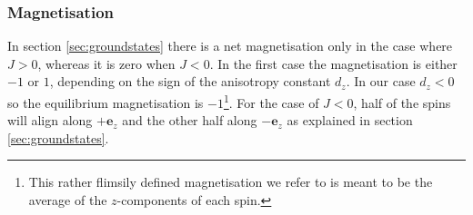 \subsubsection{Magnetisation}

In section \ref{sec:groundstates} there is a net magnetisation only in the case where $J>0$, whereas it is zero when $J<0$. In the first case the magnetisation is either $-1$ or $1$, depending on the sign of the anisotropy constant $d_z$. In our case $d_z < 0$ so the equilibrium magnetisation is $-1$\footnote{This rather flimsily defined magnetisation we refer to is meant to be the average of the $z$-components of each spin.}. For the case of $J<0$, half of the spins will align along $+\mathbf{e}_z$ and the other half along $-\mathbf{e}_z$ as explained in section \ref{sec:groundstates}.